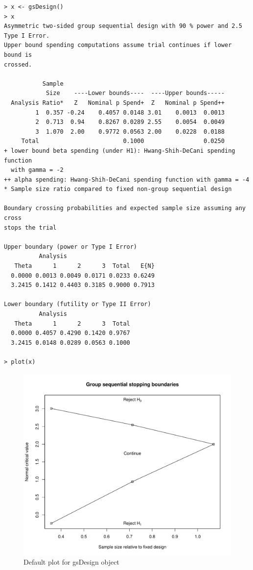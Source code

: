 \bigskip

\begin{verbatim}
> x <- gsDesign()
> x
Asymmetric two-sided group sequential design with 90 % power and 2.5
Type I Error.
Upper bound spending computations assume trial continues if lower bound is
crossed.

           Sample
            Size    ----Lower bounds----  ----Upper bounds-----
  Analysis Ratio*   Z   Nominal p Spend+  Z   Nominal p Spend++
         1  0.357 -0.24    0.4057 0.0148 3.01    0.0013  0.0013
         2  0.713  0.94    0.8267 0.0289 2.55    0.0054  0.0049
         3  1.070  2.00    0.9772 0.0563 2.00    0.0228  0.0188
     Total                        0.1000                 0.0250 
+ lower bound beta spending (under H1): Hwang-Shih-DeCani spending function 
  with gamma = -2
++ alpha spending: Hwang-Shih-DeCani spending function with gamma = -4
* Sample size ratio compared to fixed non-group sequential design

Boundary crossing probabilities and expected sample size assuming any cross
stops the trial

Upper boundary (power or Type I Error)
          Analysis
   Theta      1      2      3  Total   E{N}
  0.0000 0.0013 0.0049 0.0171 0.0233 0.6249
  3.2415 0.1412 0.4403 0.3185 0.9000 0.7913

Lower boundary (futility or Type II Error)
          Analysis
   Theta      1      2      3  Total
  0.0000 0.4057 0.4290 0.1420 0.9767
  3.2415 0.0148 0.0289 0.0563 0.1000

> plot(x)
\end{verbatim}
\begin{figure}
\begin{center}
\includegraphics[width=.6\textwidth]{figs/boundplot.pdf}
\end{center}
\caption{Default plot for gsDesign object}
\end{figure}%

